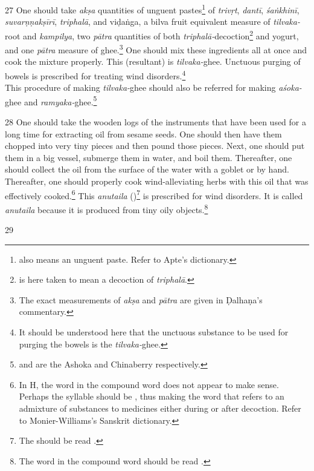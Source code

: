 \begin{translation}
    \item[27]
    One should take \textit{akṣa} quantities of unguent pastes\footnote{ also means an unguent paste. Refer to Apte's dictionary.} of \emph{trivṛt}, \emph{dantī}, \emph{śaṅkhinī}, \emph{suvarṇṇakṣīrī}, \emph{triphalā}, and \gls{viḍaṅga}, a \gls{bilva} fruit equivalent measure of \emph{tilvaka-}root and \emph{kampilya}, two \textit{pātra} quantities of both \textit{triphalā-}decoction\footnote{ is here taken to mean a decoction of \textit{triphalā}.} and yogurt, and one \textit{pātra} measure of ghee.\footnote{The exact measurements of \textit{akṣa} and \textit{pātra} are given in Ḍalhaṇa's commentary.} One should mix these ingredients all at once and cook the mixture properly. This (resultant) is \textit{tilvaka-}ghee. Unctuous purging of bowels is prescribed for treating wind disorders.\footnote{It should be understood here that the unctuous substance to be used for purging the bowels is the \textit{tilvaka-}ghee.}\\
    This procedure of making \textit{tilvaka-}ghee should also be referred for making \textit{aśoka-}ghee and \textit{ramyaka-}ghee.\footnote{ and  are the Ashoka and Chinaberry respectively.}

    \item[28]
    One should take the wooden logs of the instruments that have been used for a long time for extracting oil from sesame seeds. One should then have them chopped into very tiny pieces and then pound those pieces. Next, one should put them in a big vessel, submerge them in water, and boil them. Thereafter, one should collect the oil from the surface of the water with a goblet or by hand. Thereafter, one should properly cook wind-alleviating herbs with this oil that was effectively cooked.\footnote{In H, the word  in the compound word  does not appear to make sense. Perhaps the syllable  should be , thus making the word  that refers to an admixture of substances to medicines either during or after decoction. Refer to Monier-Williams's Sanskrit dictionary.} This \textit{anutaila} ()\footnote{The  should be read .} is prescribed for wind disorders. It is called \textit{anutaila} because it is produced from tiny oily objects.\footnote{The word  in the compound word  should be read .} 

    \item[29]
    
\end{translation}
